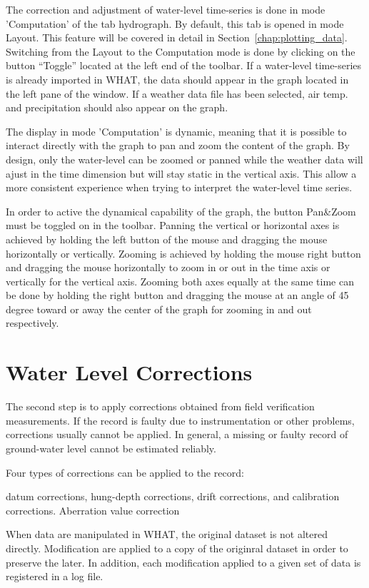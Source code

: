 \documentclass[WHATMANUAL.tex]{subfiles}
\begin{document}
The correction and adjustment of water-level time-series is done in mode 'Computation' of the tab hydrograph. By default, this tab is opened in mode Layout. This feature will be covered in detail in Section~\ref{chap:plotting_data}. Switching from the Layout to the Computation mode is done by clicking on the button ``Toggle'' located at the left end of the toolbar. If a water-level time-series is already imported in WHAT, the data should appear in the graph located in the left pane of the window. If a weather data file has been selected, air temp. and precipitation should also appear on the graph.

The display in mode 'Computation' is dynamic, meaning that it is possible to interact directly with the graph to pan and zoom the content of the graph. By design, only the water-level can be zoomed or panned while the weather data will ajust in the time dimension but will stay static in the vertical axis. This allow a more consistent experience when trying to interpret the water-level time series. 

In order to active the dynamical capability of the graph, the button Pan\&Zoom must be toggled on in the toolbar. Panning the vertical or horizontal axes is achieved by holding the left button of the mouse and dragging the mouse horizontally or vertically. Zooming is achieved by holding the mouse right button and dragging the mouse horizontally to zoom in or out in the time axis or vertically for the vertical axis. Zooming both axes equally at the same time can be done by holding the right button and dragging the mouse at an angle of 45 degree toward or away the center of the graph for zooming in and out respectively.

\section{Water Level Corrections}

The second step is to apply corrections obtained from field verification measurements. If the record is faulty due to instrumentation or other problems, corrections usually cannot be applied. In general, a missing or faulty record of ground-water level cannot be estimated reliably.

Four types of corrections can be applied to the record:

datum corrections,
hung-depth corrections,
drift corrections,
and calibration corrections. 
Aberration value correction

When data are manipulated in WHAT, the original dataset is not altered directly. Modification are applied to a copy of the originral dataset in order to preserve the later. In addition, each modification applied to a given set of data is registered in a log file.
\end{document}
